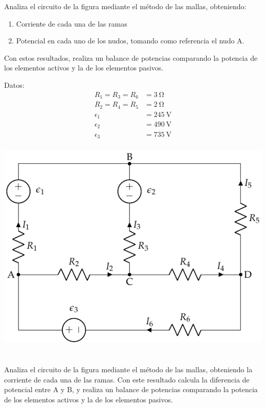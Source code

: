 \documentclass[10pt]{article}
\begin{document}
Analiza el circuito de la figura mediante el método de las mallas, obteniendo:
\begin{enumerate}
\item Corriente de cada una de las ramas
\item Potencial en cada uno de los nudos, tomando como referencia el
  nudo A.
\end{enumerate}

Con estos resultados, realiza un balance de potencias comparando la potencia de los elementos activos y la de los elementos pasivos.

\begin{minipage}{0.4\linewidth}
  Datos:
  \begin{align*}
    R_1 = R_3 = R_6 &= \SI{3}{\ohm}\\
    R_2 = R_4 = R_5 &= \SI{2}{\ohm}\\
    \epsilon_1 &= \SI{245}{\volt}\\
    \epsilon_2 &= \SI{490}{\volt}\\
    \epsilon_3 &= \SI{735}{\volt}\\
  \end{align*}
\end{minipage}
\begin{minipage}{0.6\linewidth}
  \includegraphics{figs/mallas1.pdf}
\end{minipage}

\section{}
Analiza el circuito de la figura mediante el método de las mallas, obteniendo la corriente de cada una de las ramas. Con este resultado calcula la diferencia de potencial entre A y B, y realiza un balance de potencias comparando la potencia de los elementos activos y la de los elementos pasivos.
\end{document}

